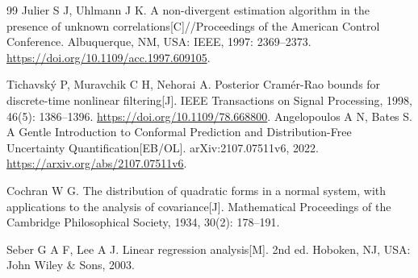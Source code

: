 \documentclass[UTF8,a4paper,zihao=-4]{ctexart}
\begin{document}
{\begin{thebibliography}{99}
 Julier S J, Uhlmann J K. A non-divergent estimation algorithm in the presence of unknown correlations[C]//Proceedings of the American Control Conference. Albuquerque, NM, USA: IEEE, 1997: 2369--2373.
\url{https://doi.org/10.1109/acc.1997.609105}.

 Tichavský P, Muravchik C H, Nehorai A. Posterior Cramér-Rao bounds for discrete-time nonlinear filtering[J]. IEEE Transactions on Signal Processing, 1998, 46(5): 1386--1396.
\url{https://doi.org/10.1109/78.668800}.
 Angelopoulos A N, Bates S. A Gentle Introduction to Conformal Prediction and Distribution-Free Uncertainty Quantification[EB/OL]. arXiv:2107.07511v6, 2022. \url{https://arxiv.org/abs/2107.07511v6}.

 Cochran W G. The distribution of quadratic forms in a normal system, with applications to the analysis of covariance[J]. Mathematical Proceedings of the Cambridge Philosophical Society, 1934, 30(2): 178--191.

 Seber G A F, Lee A J. Linear regression analysis[M]. 2nd ed. Hoboken, NJ, USA: John Wiley \& Sons, 2003.

\end{thebibliography}
}
\end{document}
